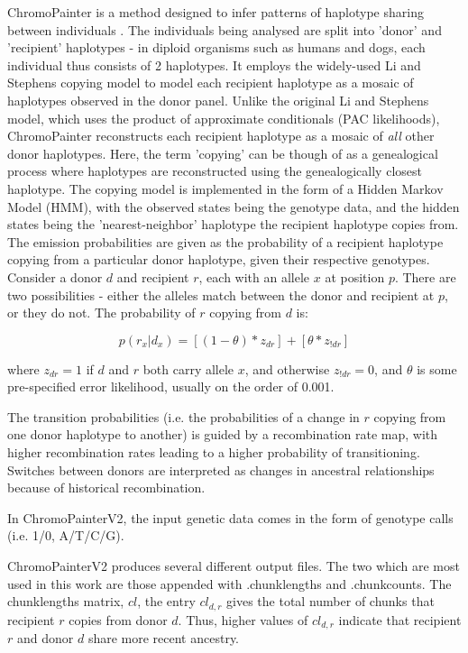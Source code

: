 ChromoPainter is a method designed to infer patterns of haplotype sharing between individuals \cite{Lawson2012}. The individuals being analysed are split into 'donor' and 'recipient' haplotypes - in diploid organisms such as humans and dogs, each individual thus consists of 2 haplotypes. It employs the widely-used Li and Stephens copying model \cite{Li2003} to model each recipient haplotype as a mosaic of haplotypes observed in the donor panel. Unlike the original Li and Stephens model, which uses the product of approximate conditionals (PAC likelihoods), ChromoPainter reconstructs each recipient haplotype as a mosaic of \textit{all} other donor haplotypes. Here, the term 'copying' can be though of as a genealogical process where haplotypes are reconstructed using the genealogically closest haplotype. The copying model is implemented in the form of a Hidden Markov Model (HMM), with the observed states being the genotype data, and the hidden states being the 'nearest-neighbor' haplotype the recipient haplotype copies from. The emission probabilities are given as the probability of a recipient haplotype copying from a particular donor haplotype, given their respective genotypes. Consider a donor $d$ and recipient $r$, each with an allele $x$ at position $p$. There are two possibilities - either the alleles match between the donor and recipient at $p$, or they do not. The probability of $r$ copying from $d$ is: 

\begin{equation}
p(r_{x} | d_{x}) = [(1-\theta) * z_{dr}] + [\theta * z_{!dr}] 
\end{equation}

where $z_{dr} = 1$ if $d$ and $r$ both carry allele $x$, and otherwise $z_{!dr} = 0$, and $\theta$ is some pre-specified error likelihood, usually on the order of 0.001. 

The transition probabilities (i.e. the probabilities of a change in $r$ copying from one donor haplotype to another) is guided by a recombination rate map, with higher recombination rates leading to a higher probability of transitioning. Switches between donors are interpreted as changes in ancestral relationships because of historical recombination.

In ChromoPainterV2, the input genetic data comes in the form of genotype calls (i.e. 1/0, A/T/C/G).

ChromoPainterV2 produces several different output files. The two which are most used in this work are those appended with .chunklengths and .chunkcounts. The chunklengths matrix, $cl$, the entry $cl_{d,r}$ gives the total number of chunks that recipient $r$ copies from donor $d$. Thus, higher values of $cl_{d,r}$ indicate that recipient $r$ and donor $d$ share more recent ancestry. 

